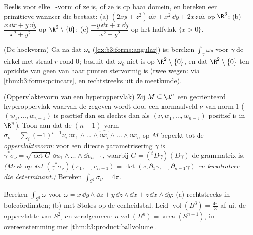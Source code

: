 \begin{exercise}[$\star\star$]\label{exo:b3:forms:3}
Beslis voor elke $1$-vorm of ze  is, of ze  is op
haar domein, en bereken een primitieve wanneer die bestaat:
(a) $(2xy + z^2)\,\dd x + x^2\,\dd y + 2xz\,\dd z$ op $\R^3$;
(b) $\dfrac{x\,\dd x + y\,\dd y}{x^2 + y^2}$ op
$\R^2\setminus\{0\}$;
(c) $\dfrac{-y\,\dd x + x\,\dd y}{x^2 + y^2}$ op het halfvlak
$\{x > 0\}$.
\end{exercise}

\begin{exercise}[$\star\star$]\label{exo:b3:forms:4}
(De hoekvorm) Ga na dat $\omega_\theta$
(\cref{ex:b3:forms:angular})  is; bereken
$\int_\gamma\omega_\theta$ voor $\gamma$ de cirkel met straal $r$
rond $0$; besluit dat $\omega_\theta$ niet  is op
$\R^2\setminus\{0\}$, en dat $\R^2\setminus\{0\}$ ten opzichte
van geen van haar punten stervormig is (twee wegen: via
\cref{thm:b3:forms:poincare}, en rechtstreeks uit de
meetkunde).
\end{exercise}

\begin{exercise}[$\star\star$]\label{exo:b3:forms:5}
(Oppervlaktevorm van een hyperoppervlak) Zij $M \subseteq \R^n$
een  georiënteerd hyperoppervlak waarvan de 
gegeven wordt door een normaalveld $\nu$ van norm $1$ ($(w_1,
\dots, w_{n-1})$ is positief dan en slechts dan als $(\nu, w_1,
\dots, w_{n-1})$ positief is in $\R^n$). Toon aan dat de
$(n-1)$-vorm $\sigma_\nu =
\sum_i(-1)^{i-1}\nu_i\,\dd x_1\wedge\dots\wedge\widehat{\dd
x_i}\wedge\dots\wedge\dd x_n$ op $M$ beperkt tot de
\emph{oppervlaktevorm}: voor een directe parametrisering $\gamma$
is $\gamma^*\sigma_\nu = \sqrt{\det G}\,\dd u_1\wedge\dots
\wedge\dd u_{n-1}$, waarbij $G = ({}^t D\gamma)(D\gamma)$ de
grammatrix is. \emph{(Merk op dat $(\gamma^*\sigma_\nu)(e_1,
\dots, e_{n-1}) = \det(\nu, \partial_1\gamma, \dots,
\partial_{n-1}\gamma)$ en kwadrateer die determinant.)} Bereken
$\int_{S^2}\sigma_\nu = 4\pi$.
\end{exercise}

\begin{exercise}[$\star\star$]\label{exo:b3:forms:6}
Bereken $\int_{S^2}\omega$ voor $\omega = x\,\dd y\wedge\dd z +
y\,\dd z\wedge\dd x + z\,\dd x\wedge\dd y$: (a) rechtstreeks in
bolcoördinaten; (b) met Stokes op de eenheidsbal. Leid
$\operatorname{vol}(B^3) = \frac{4\pi}3$ af uit de oppervlakte
van $S^2$, en veralgemeen: $n\operatorname{vol}(B^n) =
\operatorname{area}(S^{n-1})$, in overeenstemming met
\cref{thm:b3:product:ballvolume}.
\end{exercise}

